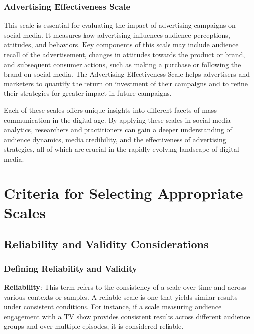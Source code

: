 \documentclass[
]{book}
\begin{document}
\subsubsection*{Advertising Effectiveness Scale}\label{advertising-effectiveness-scale}

This scale is essential for evaluating the impact of advertising campaigns on social media. It measures how advertising influences audience perceptions, attitudes, and behaviors. Key components of this scale may include audience recall of the advertisement, changes in attitudes towards the product or brand, and subsequent consumer actions, such as making a purchase or following the brand on social media. The Advertising Effectiveness Scale helps advertisers and marketers to quantify the return on investment of their campaigns and to refine their strategies for greater impact in future campaigns.

Each of these scales offers unique insights into different facets of mass communication in the digital age. By applying these scales in social media analytics, researchers and practitioners can gain a deeper understanding of audience dynamics, media credibility, and the effectiveness of advertising strategies, all of which are crucial in the rapidly evolving landscape of digital media.

\section*{Criteria for Selecting Appropriate Scales}\label{criteria-for-selecting-appropriate-scales}

\subsection*{Reliability and Validity Considerations}\label{reliability-and-validity-considerations}

\subsubsection*{Defining Reliability and Validity}\label{defining-reliability-and-validity}

\textbf{Reliability}: This term refers to the consistency of a scale over time and across various contexts or samples. A reliable scale is one that yields similar results under consistent conditions. For instance, if a scale measuring audience engagement with a TV show provides consistent results across different audience groups and over multiple episodes, it is considered reliable.
\end{document}
